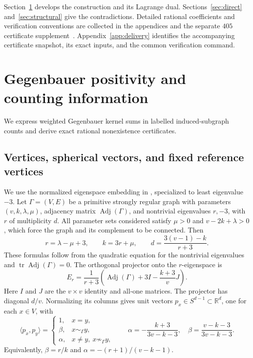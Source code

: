 \documentclass[11pt]{article}
\theoremstyle{remark}
\newcommand{\R}{\mathbb R}
\DeclareMathOperator{\Adj}{Adj}
\DeclareMathOperator{\tr}{tr}
\numberwithin{equation}{section}
\begin{document}
Section~\ref{sec:method} develops the construction and its Lagrange
dual. Sections~\ref{sec:direct} and~\ref{sec:structural} give the
contradictions. Detailed rational coefficients and verification
conventions are collected in the appendices and the separate
$405$ certificate supplement~\cite{supp405}. Appendix~\ref{app:delivery}
identifies the accompanying certificate snapshot, its exact inputs,
and the common verification command.

\section{Gegenbauer positivity and counting information}\label{sec:method}
We express weighted Gegenbauer kernel sums in labelled induced-subgraph
counts and derive exact rational nonexistence certificates.

\subsection{Vertices, spherical vectors, and fixed reference vertices}
We use the normalized eigenspace embedding in
\cite[Section~4.1]{LY}, specialized to least eigenvalue $-3$.
Let $\Gamma=(V,E)$ be a primitive strongly regular graph with parameters
$(v,k,\lambda,\mu)$, adjacency matrix $\Adj(\Gamma)$, and nontrivial
eigenvalues $r,-3$, with $r$ of multiplicity $d$. All parameter sets considered
satisfy $\mu>0$ and $v-2k+\lambda>0$, which force the graph and its
complement to be connected. Then
\begin{equation}\label{eq:spectral}
 r=\lambda-\mu+3,\qquad k=3r+\mu,\qquad
 d=\frac{3(v-1)-k}{r+3}.
\end{equation}
These formulas follow from the quadratic equation for the nontrivial
eigenvalues and $\tr\Adj(\Gamma)=0$. The orthogonal projector onto the
$r$-eigenspace is
\[
 E_r=\frac{1}{r+3}\left(\Adj(\Gamma)+3I-\frac{k+3}{v}J\right).
\]
Here $I$ and $J$ are the $v\times v$ identity and all-one matrices.
The projector has diagonal $d/v$. Normalizing its columns gives unit vectors
$p_x\in S^{d-1}\subset\R^d$, one for each $x\in V$, with
\begin{equation}\label{eq:sphere}
 \langle p_x,p_y\rangle=
 \begin{cases}1,&x=y,\\ \beta,&x\sim_\Gamma y,\\
 \alpha,&x\ne y,\ x\not\sim_\Gamma y,
 \end{cases}
 \qquad
 \alpha=-\frac{k+3}{3v-k-3},\quad
 \beta=\frac{v-k-3}{3v-k-3}.
\end{equation}
Equivalently, $\beta=r/k$ and $\alpha=-(r+1)/(v-k-1)$.
\end{document}
